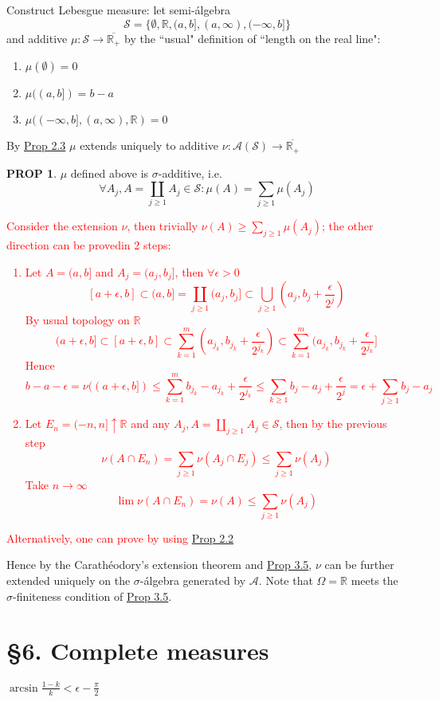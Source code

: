 \documentclass[hidelinks]{article}
\theoremstyle{definition}
\theoremstyle{dotless}
\newtheorem{proposition}{PROP}[section]
\theoremstyle{remark}
\begin{document}
Construct Lebesgue measure: let semi-álgebra \[\mathscr{S}=\{\emptyset,\mathbb{R},(a,b],(a,\infty),(-\infty,b]\}\] and additive $\mu:\mathscr{S}\to\overline{\mathbb{R}_+}$ by the ``usual" definition of ``length on the real line":\begin{enumerate}[label=\arabic*\degree]
    \item $\mu(\emptyset)=0$
    \item $\mu((a,b])=b-a$
    \item $\mu((-\infty,b],(a,\infty),\mathbb{R})=0$
\end{enumerate}
By \hyperref[Prop 2.3]{Prop 2.3} $\mu$ extends uniquely to additive $\nu:\mathscr{A}(\mathscr{S})\to\overline{\mathbb{R}_+}$

\begin{proposition}
$\mu$ defined above is $\sigma$-additive, i.e.
\[\forall A_j,A=\coprod_{j\geq1}A_j\in\mathscr{S}:\mu(A)=\sum_{j\geq1}\mu(A_j)\]
\end{proposition}
\textcolor{red}{Consider the extension $\nu$, then trivially $\nu(A)\geq\sum_{j\geq1}\mu(A_j)$; the other direction can be provedin 2 steps:
\begin{enumerate}[label=\arabic*\degree]
    \item Let $A=(a,b]$ and $A_j=(a_j,b_j]$, then $\forall\epsilon>0$
    \[[a+\epsilon,b]\subset(a,b]=\coprod_{j\geq1}(a_j,b_j]\subset\bigcup_{j\geq1}(a_j,b_j+\frac{\epsilon}{2^j})\]
    By usual topology on $\mathbb{R}$
    \[(a+\epsilon,b]\subset[a+\epsilon,b]\subset\sum_{k=1}^m(a_{j_k},b_{j_k}+\frac{\epsilon}{2^{j_k}})\subset\sum_{k=1}^m(a_{j_k},b_{j_k}+\frac{\epsilon}{2^{j_k}}]\]
    Hence
    \[b-a-\epsilon=\nu((a+\epsilon,b])\leq\sum_{k=1}^mb_{j_k}-a_{j_k}+\frac{\epsilon}{2^{j_k}}\leq\sum_{k\geq1}b_j-a_j+\frac{\epsilon}{2^j}=\epsilon+\sum_{j\geq1}b_j-a_j\]
    \item Let $E_n=(-n,n]\uparrow\mathbb{R}$ and any $A_j,A=\coprod_{j\geq1}A_j\in\mathscr{S}$, then by the previous step
    \[\nu(A\cap E_n)=\sum_{j\geq1}\nu(A_j\cap E_j)\leq\sum_{j\geq1}\nu(A_j)\]
    Take $n\to\infty$
    \[\lim\nu(A\cap E_n)=\nu(A)\leq\sum_{j\geq1}\nu(A_j)\]
\end{enumerate}\bigbreak
Alternatively, one can prove by using \hyperref[Prop 2.2]{Prop 2.2}}

Hence by the Carathéodory's extension theorem and \hyperref[Prop 3.5]{Prop 3.5}, $\nu$ can be further extended uniquely on the $\sigma$-álgebra generated by $\mathscr{A}$. Note that $\Omega=\mathbb{R}$ meets the $\sigma$-finiteness condition of \hyperref[Prop 3.5]{Prop 3.5}.




\newpage
\section*{\S6. Complete measures}
\setcounter{section}{6}


$\arcsin{\frac{1-k}{k}}<\epsilon-\frac{\pi}{2}$
\end{document}
